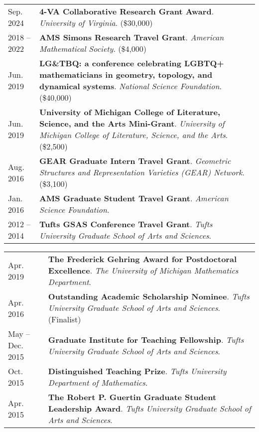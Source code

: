 
    \medskip


    \medskip
    
    \begin{center}
    {
    \renewcommand{\arraystretch}{1.5}
    \begin{longtable}{p{}  p{}}
     Sep.  2024 & \textbf{4-VA Collaborative Research Grant Award}. \textit{University of Virginia}. (\$30,000) \\ 
   2018 --    2022 & \textbf{AMS Simons Research Travel Grant}. \textit{American Mathematical Society}. (\$4,000) \\ 
 Jun.  2019 & \textbf{LG\&TBQ: a conference celebrating LGBTQ+ mathematicians in geometry, topology, and dynamical systems}. \textit{National Science Foundation}. (\$40,000) \\ 
 Jun.  2019 & \textbf{University of Michigan College of Literature, Science, and the Arts Mini-Grant}. \textit{University of Michigan College of Literature, Science, and the Arts}. (\$2,500) \\ 
 Aug.  2016 & \textbf{GEAR Graduate Intern Travel Grant}. \textit{Geometric Structures and Representation Varieties (GEAR) Network}. (\$3,100) \\ 
 Jan.  2016 & \textbf{AMS Graduate Student Travel Grant}. \textit{American Science Foundation}.  \\ 
   2012 --    2014 & \textbf{Tufts GSAS Conference Travel Grant}. \textit{Tufts University Graduate School of Arts and Sciences}.  
    \end{longtable}
    } 
    \end{center}

    \vspace{-1em}
    
    \medskip


    \medskip
    
    \begin{center}
    {
    \renewcommand{\arraystretch}{1.5}
    \begin{longtable}{p{}  p{}}
     Apr.  2019 & \textbf{The Frederick Gehring Award for Postdoctoral Excellence}. \textit{The University of Michigan Mathematics Department}.  \\ 
 Apr.  2016 & \textbf{Outstanding Academic Scholarship Nominee}. \textit{Tufts University Graduate School of Arts and Sciences}. (Finalist) \\ 
 May  --  Dec.  2015 & \textbf{Graduate Institute for Teaching Fellowship}. \textit{Tufts University Graduate School of Arts and Sciences}.  \\ 
 Oct.  2015 & \textbf{Distinguished Teaching Prize}. \textit{Tufts University Department of Mathematics}.  \\ 
 Apr.  2015 & \textbf{The Robert P. Guertin Graduate Student Leadership Award}. \textit{Tufts University Graduate School of Arts and Sciences}.  
    \end{longtable}
    } 
    \end{center}

    \vspace{-1em}
    